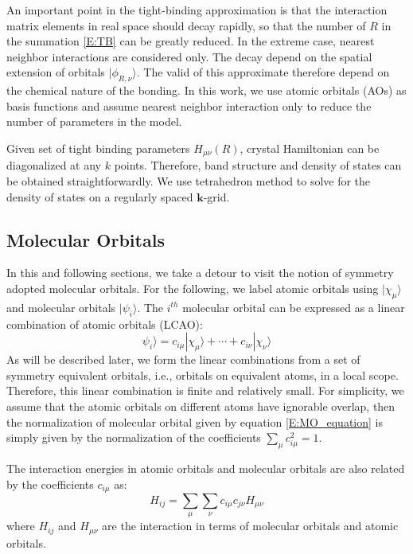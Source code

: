 \documentclass{article}
\begin{document}
An important point in the tight-binding approximation is that the interaction matrix elements in real
space should decay rapidly, so that the number of $R$ in the summation \eqref{E:TB} can be greatly 
reduced. In the extreme case, nearest neighbor interactions are considered only. 
The decay depend on the spatial extension of orbitals $|\phi_{R,\nu}\rangle$. 
The valid of this approximate therefore depend on the chemical nature of the bonding. In this work, we use 
atomic orbitals (AOs) as basis functions and assume nearest neighbor interaction only to reduce the 
number of parameters in the model. 

Given set of tight binding parameters $H_{\mu\nu}(R)$, crystal Hamiltonian can be diagonalized at any $k$ points. Therefore, 
band structure and density of states can be obtained straightforwardly. We use tetrahedron method to solve for 
the density of states on a regularly spaced $\mathbf{k}$-grid. 

\subsection{Molecular Orbitals}
In this and following sections, we take a detour to visit the notion of symmetry adopted molecular orbitals. 
For the following, we label atomic orbitals using $|\chi_{\mu}\rangle$ and molecular orbitals $|\psi_i\rangle$. The $i^{th}$ molecular 
orbital can be expressed as a linear combination of atomic orbitals (LCAO): 
\begin{equation}
    \label{E:MO_equation}
    \psi_i\rangle = c_{i\mu} |\chi_{\mu}\rangle + \cdots + c_{i\nu} |\chi_{\nu}\rangle
\end{equation}
As will be described later, we form the linear combinations from a set of symmetry equivalent orbitals, i.e., orbitals 
on equivalent atoms, in a local scope. Therefore, this linear combination is finite and relatively small. For simplicity,
we assume that the atomic orbitals on different atoms have ignorable overlap, then the normalization 
of molecular orbital given by equation \eqref{E:MO_equation} is simply given by the normalization of the 
coefficients $\sum_{\mu}c_{i\mu}^2 = 1$.

The interaction energies in atomic orbitals and molecular orbitals are also related by the coefficients $c_{i\mu}$ as:
\begin{equation}
    \label{E:HAO_HMO_transformation}
    H_{ij} = \sum_{\mu} \sum_{\nu} c_{i\mu} c_{j\nu} H_{\mu\nu}
\end{equation}
where $H_{ij}$ and $H_{\mu\nu}$ are the interaction in terms of molecular orbitals and atomic orbitals. 
\end{document}
